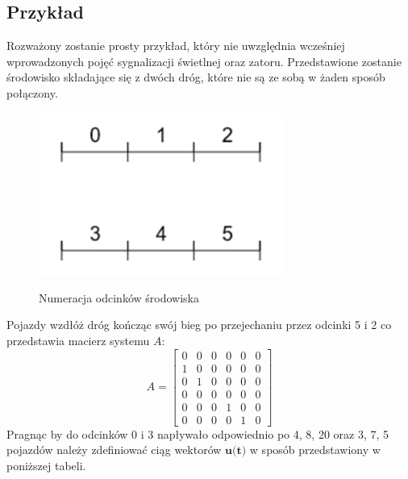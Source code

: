 \documentclass[12pt]{book}
\theoremstyle{plain}
\begin{document}
\subsection{Przykład}
Rozważony zostanie prosty przykład, który nie uwzględnia wcześniej wprowadzonych pojęć sygnalizacji świetlnej oraz zatoru. Przedstawione zostanie środowisko składające się z dwóch dróg, które nie są ze sobą w żaden sposób połączony.
\begin{figure}[H]
	\centering
	\includegraphics[width=8cm]{images/env_12}
	\label{fig:env_12}
	\caption{Numeracja odcinków środowiska}
\end{figure} \noindent
Pojazdy wzdłóż dróg kończąc swój bieg po przejechaniu przez odcinki 5 i 2 co przedstawia macierz systemu $A$:
\def \A{\begin{bmatrix}
0 & 0 & 0 & 0 & 0 & 0 \\
1 & 0 & 0 & 0 & 0 & 0 \\
0 & 1 & 0 & 0 & 0 & 0 \\
0 & 0 & 0 & 0 & 0 & 0 \\
0 & 0 & 0 & 1 & 0 & 0 \\
0 & 0 & 0 & 0 & 1 & 0
\end{bmatrix}}
\[A=\A \]
Pragnąc by do odcinków 0 i 3  napływało odpowiednio po 4, 8, 20 oraz 3, 7, 5 pojazdów należy zdefiniować ciąg wektorów $\textbf{u(t)}$ w sposób przedstawiony w poniższej tabeli.
\end{document}
